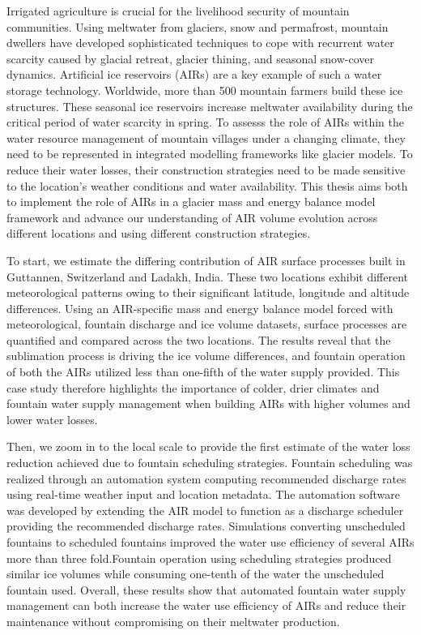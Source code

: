 %
\label{sec:abstract}

Irrigated agriculture is crucial for the livelihood security of mountain communities. Using meltwater from
glaciers, snow and permafrost, mountain dwellers have developed sophisticated techniques to cope with recurrent
water scarcity caused by glacial retreat, glacier thining, and seasonal snow-cover dynamics. Artificial ice
reservoirs (AIRs) are a key example of such a water storage technology. Worldwide, more than 500 mountain
farmers build these ice structures. These seasonal ice reservoirs increase meltwater availability during the
critical period of water scarcity in spring. To assesss the role of AIRs within the water resource management of
mountain villages under a changing climate, they need to be represented in integrated modelling frameworks like
glacier models. To reduce their water losses, their construction strategies need to be made sensitive to the
location's weather conditions and water availability. This thesis aims both to implement the role of AIRs in a
glacier mass and energy balance model framework and advance our understanding of AIR volume evolution across
different locations and using different construction strategies.  

To start, we estimate the differing contribution of AIR surface processes built in Guttannen, Switzerland and
Ladakh, India. These two locations exhibit different meteorological patterns owing to their significant
latitude, longitude and altitude differences. Using an AIR-specific mass and energy balance model forced with
meteorological, fountain discharge and ice volume datasets, surface processes are quantified and compared across
the two locations. The results reveal that the sublimation process is driving the ice volume differences, and
fountain operation of both the AIRs utilized less than one-fifth of the water supply provided. This case study
therefore highlights the importance of colder, drier climates and fountain water supply management when building
AIRs with higher volumes and lower water losses.  

Then, we zoom in to the local scale to provide the first estimate of the water loss reduction achieved due to
fountain scheduling strategies. Fountain scheduling was realized through an automation system computing
recommended discharge rates using real-time weather input and location metadata. The automation software was
developed by extending the AIR model to function as a discharge scheduler providing the recommended discharge
rates. Simulations converting unscheduled fountains to scheduled fountains improved the water use efficiency of
several AIRs more than three fold.Fountain operation using scheduling strategies produced similar ice volumes
while consuming one-tenth of the water the unscheduled fountain used.  Overall, these results show that
automated fountain water supply management can both increase the water use efficiency of AIRs and reduce their
maintenance without compromising on their meltwater production.


